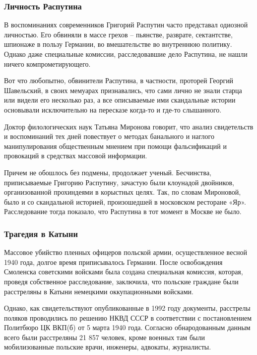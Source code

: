 \subsubsection{Личность Распутина}

В воспоминаниях современников Григорий Распутин часто представал одиозной
личностью. Его обвиняли в массе грехов – пьянстве, разврате, сектантстве,
шпионаже в пользу Германии, во вмешательстве во внутреннюю политику. Однако
даже специальные комиссии, расследовавшие дело Распутина, не нашли ничего
компрометирующего.

Вот что любопытно, обвинители Распутина, в частности, проторей Георгий
Шавельский, в своих мемуарах признавались, что сами лично не знали старца или
видели его несколько раз, а все описываемые ими скандальные истории основывали
исключительно на пересказе когда-то и где-то слышанного.

Доктор филологических наук Татьяна Миронова говорит, что анализ свидетельств и
воспоминаний тех дней повествует о методах банального и наглого манипулирования
общественным мнением при помощи фальсификаций и провокаций в средствах массовой
информации.

Причем не обошлось без подмены, продолжает ученый. Бесчинства, приписываемые
Григорию Распутину, зачастую были клоунадой двойников, организованной
прохиндеями в корыстных целях. Так, по словам Мироновой, было и со скандальной
историей, произошедшей в московском ресторане «Яр». Расследование тогда
показало, что Распутина в тот момент в Москве не было.

\subsubsection{Трагедия в Катыни}

Массовое убийство пленных офицеров польской армии, осуществленное весной 1940
года, долгое время приписывалось Германии. После освобождения Смоленска
советскими войсками была создана специальная комиссия, которая, проведя
собственное расследование, заключила, что польские граждане были расстреляны в
Катыни немецкими оккупационными войсками.

Однако, как свидетельствуют опубликованные в 1992 году документы, расстрелы
поляков проводились по решению НКВД СССР в соответствии с постановлением
Политбюро ЦК ВКП(б) от 5 марта 1940 года. Согласно обнародованным данным всего
были расстреляны 21 857 человек, кроме военных там были мобилизованные польские
врачи, инженеры, адвокаты, журналисты.

